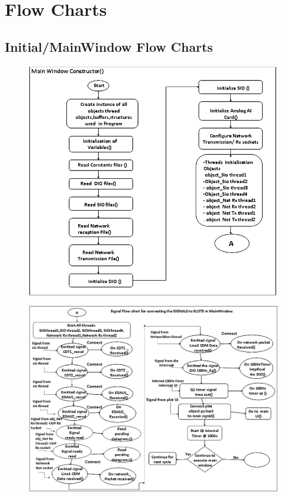 \chapter{Flow Charts}
\label{Chapter8}

\section{Initial/MainWindow Flow Charts}
\begin{figure}[H]
	\centering
	\includegraphics[width=\linewidth]{./FlowCharts/PngFlowCharts/Main1.png}
\end{figure}
\begin{figure}[H]
	\centering
	\includegraphics[width=\linewidth]{./FlowCharts/PngFlowCharts/Main2.png}
\end{figure}
